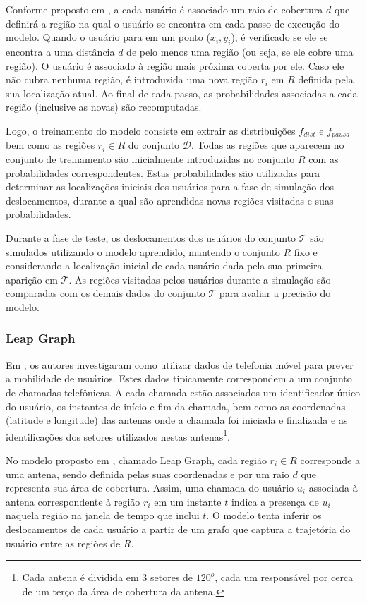\documentclass[10pt, a4paper, onecolumn, conference, compsocconf]{IEEEtran}
\begin{document}
Conforme proposto em \cite{Munjal2011},  a cada usuário é associado um raio de cobertura $d$ que definirá a região na qual o usuário se encontra em cada passo de execução do modelo. Quando o usuário para em um ponto ($x_i,y_i$), é verificado se ele se encontra a uma distância $d$ de pelo menos uma região (ou seja, se ele cobre uma região). O usuário é associado à  região mais próxima coberta por ele. Caso ele não cubra nenhuma região, é introduzida uma nova região $r_i$ em $R$ definida pela sua localização atual. Ao final de cada passo, as probabilidades  associadas a cada região (inclusive as novas) são recomputadas. 

Logo, o  treinamento do modelo consiste em  extrair as distribuições $f_{dist}$ e $f_{pausa}$ bem como as regiões $r_i \in R$  do conjunto $\mathcal{D}$. Todas as regiões que aparecem no conjunto de treinamento são inicialmente introduzidas no conjunto $R$ com as probabilidades correspondentes.  Estas probabilidades são utilizadas para determinar as localizações iniciais dos usuários para a fase de simulação  dos deslocamentos, durante a qual são aprendidas novas regiões visitadas e suas probabilidades.

Durante a fase de teste,  os deslocamentos dos usuários do conjunto $\mathcal{T}$ são simulados utilizando o modelo aprendido, mantendo o conjunto $R$ fixo e considerando a localização inicial de cada usuário dada pela sua primeira aparição em $\mathcal{T}$.  As regiões visitadas pelos usuários durante a simulação são comparadas com os demais dados do conjunto  $\mathcal{T}$ para avaliar a precisão do modelo. 


\subsubsection{Leap Graph}\label{subsub:leap}

Em \cite{Dong2013}, os autores investigaram como utilizar dados de telefonia móvel para prever a mobilidade de usuários. 
Estes dados tipicamente correspondem a um conjunto de chamadas telefônicas. A cada chamada estão associados um identificador único do usuário, os instantes de início e fim da chamada, bem como as coordenadas (latitude e longitude) das antenas onde a chamada foi iniciada e finalizada e as identificações  dos setores utilizados nestas antenas\footnote{Cada antena é dividida em 3 setores de $120^{o}$, cada um responsável por cerca de um terço da área de cobertura da antena.}. 

No modelo proposto em \cite{Dong2013}, chamado Leap Graph, cada região $r_i \in R$  corresponde a uma antena, sendo definida pelas suas coordenadas e por um  raio $d$ que representa sua área de cobertura. Assim, uma chamada do usuário $u_i$ associada à  antena correspondente à região $r_i$ em um instante $t$ indica a presença de $u_i$ naquela região na janela de tempo que inclui $t$. O modelo tenta inferir os deslocamentos de cada usuário a partir de um grafo que captura a trajetória do usuário entre as regiões de $R$. 
\end{document}
